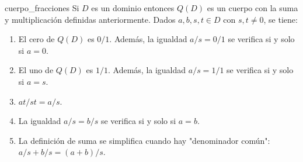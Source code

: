 \begin{proposition}{}{cuerpo_fracciones}
Si \(D\) es un dominio entonces \(Q(D)\) es un cuerpo con la suma y multiplicación definidas anteriormente. Dados \(a, b, s, t \in D\) con \(s, t \neq 0\), se tiene:

\begin{enumerate}
\item El cero de \(Q(D)\) es \(0/1\). Además, la igualdad \(a/s = 0/1\) se verifica si y solo si \(a = 0\).

\item El uno de \(Q(D)\) es \(1/1\). Además, la igualdad \(a/s = 1/1\) se verifica si y solo si \(a = s\).

\item \(at/st = a/s\).

\item La igualdad \(a/s = b/s\) se verifica si y solo si \(a = b\).

\item La definición de suma se simplifica cuando hay "denominador común": \(a/s + b/s = (a + b)/s\).
\end{enumerate}

\end{proposition}

